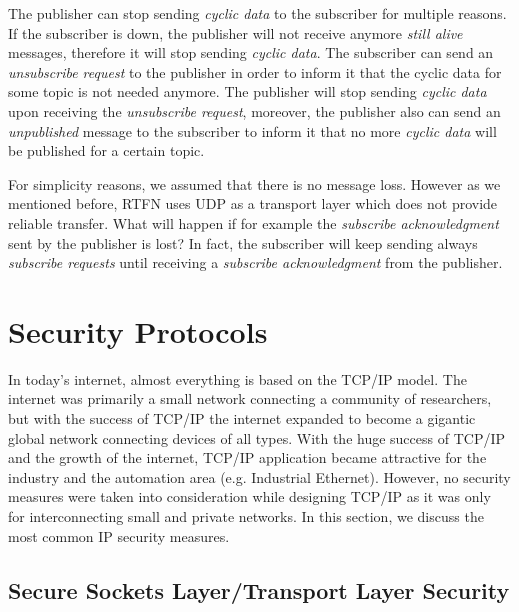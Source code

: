 The publisher can stop sending \textit{cyclic data} to the subscriber for multiple reasons.
If the subscriber is down, the publisher will not receive anymore \textit{still alive} messages, therefore
it will stop sending \textit{cyclic data}.
The subscriber can send an \textit{unsubscribe request} to the publisher in order to inform it that the cyclic
data for some topic is not needed anymore. The publisher will stop sending \textit{cyclic data} upon receiving the \textit{unsubscribe request}, moreover,
the publisher also can send an \textit{unpublished} message to the subscriber to inform it that no more \textit{cyclic data} will be published
for a certain topic.

For simplicity reasons, we assumed that there is no message loss. However as we mentioned before,
\ac{RTFN} uses \ac{UDP} as a transport layer which does not provide reliable transfer. What will happen if for
example the \textit{subscribe acknowledgment} sent by the publisher is lost? In fact, the subscriber will keep
sending always \textit{subscribe requests} until receiving a \textit{subscribe acknowledgment} from the publisher.

\section{Security Protocols}

In today's internet, almost everything is based on the \ac{TCP}/\ac{IP} model. The internet was primarily a small network
connecting a community of researchers, but with the success of \ac{TCP}/\ac{IP} the internet expanded to become a gigantic global
network connecting devices of all types. With the huge success of \ac{TCP}/\ac{IP} and the growth of the internet, \ac{TCP}/\ac{IP} application
became attractive for the industry and the automation area (e.g. Industrial Ethernet).
However, no security measures were taken into consideration while designing \ac{TCP}/\ac{IP} as it was only for
interconnecting small and private networks. In this section, we discuss the most common \ac{IP} security
measures.

\subsection{Secure Sockets Layer/Transport Layer Security}


